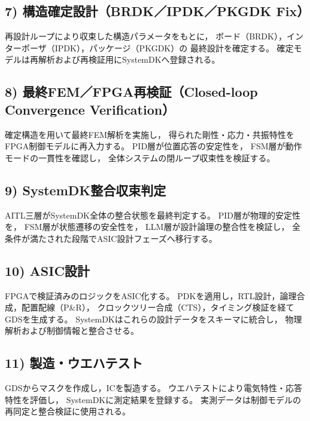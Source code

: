 \subsection{7) 構造確定設計（BRDK／IPDK／PKGDK Fix）}
再設計ループにより収束した構造パラメータをもとに，
ボード（BRDK），インターポーザ（IPDK），パッケージ（PKGDK）の
最終設計を確定する。
確定モデルは再解析および再検証用にSystemDKへ登録される。

\subsection{8) 最終FEM／FPGA再検証（Closed-loop Convergence Verification）}
確定構造を用いて最終FEM解析を実施し，
得られた剛性・応力・共振特性をFPGA制御モデルに再入力する。
PID層が位置応答の安定性を，
FSM層が動作モードの一貫性を確認し，
全体システムの閉ループ収束性を検証する。

\subsection{9) SystemDK整合収束判定}
AITL三層がSystemDK全体の整合状態を最終判定する。
PID層が物理的安定性を，
FSM層が状態遷移の安全性を，
LLM層が設計論理の整合性を検証し，
全条件が満たされた段階でASIC設計フェーズへ移行する。

\subsection{10) ASIC設計}
FPGAで検証済みのロジックをASIC化する。
PDKを適用し，RTL設計，論理合成，配置配線（P\&R），
クロックツリー合成（CTS），タイミング検証を経てGDSを生成する。
SystemDKはこれらの設計データをスキーマに統合し，
物理解析および制御情報と整合させる。

\subsection{11) 製造・ウエハテスト}
GDSからマスクを作成し，ICを製造する。
ウエハテストにより電気特性・応答特性を評価し，
SystemDKに測定結果を登録する。
実測データは制御モデルの再同定と整合検証に使用される。

